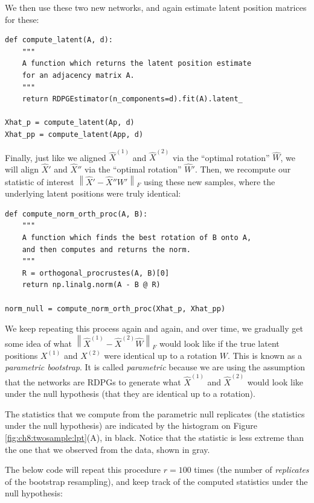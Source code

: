 We then use these two new networks, and again estimate latent position matrices for these:

\begin{lstlisting}[style=python]
def compute_latent(A, d):
    """
    A function which returns the latent position estimate
    for an adjacency matrix A.
    """
    return RDPGEstimator(n_components=d).fit(A).latent_

Xhat_p = compute_latent(Ap, d)
Xhat_pp = compute_latent(App, d)
\end{lstlisting}

Finally, just like we aligned $\hat X^{(1)}$ and $\hat X^{(2)}$ via the ``optimal rotation'' $\hat W$, we will align $\hat X'$ and $\hat X''$ via the ``optimal rotation'' $\hat W'$. Then, we recompute our statistic of interest $\left\|\hat X' - \hat X''W'\right\|_F$ using these new samples, where the underlying latent positions were truly identical:

\begin{lstlisting}[style=python]
def compute_norm_orth_proc(A, B):
    """
    A function which finds the best rotation of B onto A,
    and then computes and returns the norm.
    """
    R = orthogonal_procrustes(A, B)[0]
    return np.linalg.norm(A - B @ R)

norm_null = compute_norm_orth_proc(Xhat_p, Xhat_pp)
\end{lstlisting}


We keep repeating this process again and again, and over time, we gradually get some idea of what $\left\|\hat X^{(1)} - \hat X^{(2)}\hat W\right\|_F$ would look like if the true latent positions $X^{(1)}$ and $X^{(2)}$ were identical up to a rotation $W$. This is known as a \textit{parametric bootstrap}. It is called \textit{parametric} because we are using the assumption that the networks are RDPGs to generate what $\hat X^{(1)}$ and $\hat X^{(2)}$ would look like under the null hypothesis (that they are identical up to a rotation). 

The statistics that we compute from the parametric null replicates (the statistics under the null hypothesis) are indicated by the histogram on Figure \ref{fig:ch8:twosample:lpt}(A), in black. Notice that the statistic is less extreme than the one that we observed from the data, shown in gray. 

The below code will repeat this procedure $r=100$ times (the number of \textit{replicates} of the bootstrap resampling), and keep track of the computed statistics under the null hypothesis:

